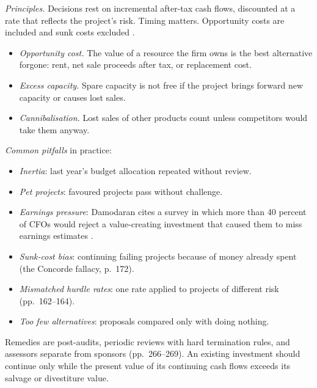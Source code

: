 \begin{qfmethod}\label{meth:capital-allocation-principles}
 \emph{Principles.} Decisions rest on incremental after-tax cash flows, discounted at a rate that reflects the project's risk. Timing matters. Opportunity costs are included and sunk costs excluded \citep[pp.~171--173, 245--249]{applied-corporate-finance-2014}.
\begin{itemize}
\item \emph{Opportunity cost.} The value of a resource the firm owns is the best alternative forgone: rent, net sale proceeds after tax, or replacement cost.
\item \emph{Excess capacity.} Spare capacity is not free if the project brings forward new capacity or causes lost sales.
\item \emph{Cannibalisation.} Lost sales of other products count unless competitors would take them anyway.
\end{itemize}

\emph{Common pitfalls} in practice:
\begin{itemize}
\item \emph{Inertia}: last year's budget allocation repeated without review.
\item \emph{Pet projects}: favoured projects pass without challenge.
\item \emph{Earnings pressure}: Damodaran cites a survey in which more than 40 percent of CFOs would reject a value-creating investment that caused them to miss earnings estimates \citep[p.~171]{applied-corporate-finance-2014}.
\item \emph{Sunk-cost bias}: continuing failing projects because of money already spent (the Concorde fallacy, p.~172).
\item \emph{Mismatched hurdle rates}: one rate applied to projects of different risk (pp.~162--164).
\item \emph{Too few alternatives}: proposals compared only with doing nothing.
\end{itemize}
Remedies are post-audits, periodic reviews with hard termination rules, and assessors separate from sponsors (pp.~266--269). An existing investment should continue only while the present value of its continuing cash flows exceeds its salvage or divestiture value.


\end{qfmethod}
